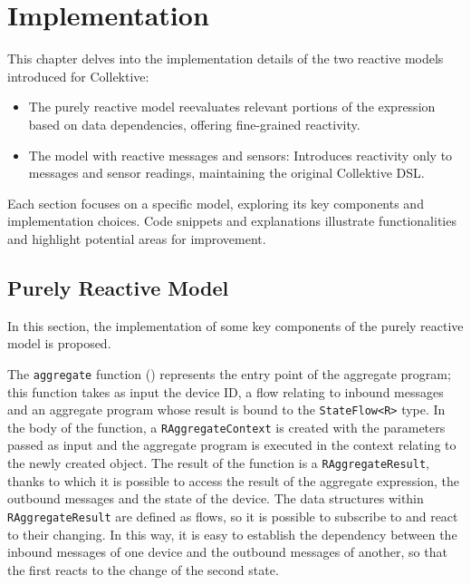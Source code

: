 
\chapter{Implementation}
\label{chap:implementation}

This chapter delves into the implementation details of the two reactive models introduced for Collektive:

\begin{itemize}
    \item The purely reactive model reevaluates relevant portions of the expression based on data dependencies, offering fine-grained reactivity.
    \item The model with reactive messages and sensors: Introduces reactivity only to messages and sensor readings, maintaining the original Collektive DSL.
\end{itemize}

Each section focuses on a specific model, exploring its key components and implementation choices. Code snippets and explanations illustrate functionalities and highlight potential areas for improvement.

\section{Purely Reactive Model}
\label{section:prm}

In this section, the implementation of some key components of the purely reactive model is proposed.

The \texttt{aggregate} function () represents the entry point of the aggregate program; this function takes as input the device ID, a flow relating to inbound messages and an aggregate program whose result is bound to the \texttt{StateFlow<R>} type. In the body of the function, a \texttt{RAggregateContext} is created with the parameters passed as input and the aggregate program is executed in the context relating to the newly created object. The result of the function is a \texttt{RAggregateResult}, thanks to which it is possible to access the result of the aggregate expression, the outbound messages and the state of the device. The data structures within \texttt{RAggregateResult} are defined as flows, so it is possible to subscribe to and react to their changing. In this way, it is easy to establish the dependency between the inbound messages of one device and the outbound messages of another, so that the first reacts to the change of the second state.

